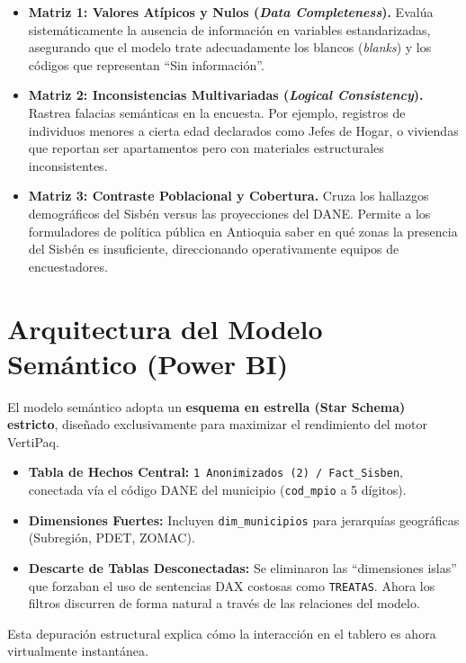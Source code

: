 \documentclass[12pt, a4paper]{article}
\begin{document}
\begin{itemize}
    \item \textbf{Matriz 1: Valores Atípicos y Nulos (\textit{Data Completeness}).} Evalúa sistemáticamente la ausencia de información en variables estandarizadas, asegurando que el modelo trate adecuadamente los blancos (\textit{blanks}) y los códigos que representan ``Sin información''.
    \item \textbf{Matriz 2: Inconsistencias Multivariadas (\textit{Logical Consistency}).} Rastrea falacias semánticas en la encuesta. Por ejemplo, registros de individuos menores a cierta edad declarados como Jefes de Hogar, o viviendas que reportan ser apartamentos pero con materiales estructurales inconsistentes.
    \item \textbf{Matriz 3: Contraste Poblacional y Cobertura.} Cruza los hallazgos demográficos del Sisbén versus las proyecciones del DANE. Permite a los formuladores de política pública en Antioquia saber en qué zonas la presencia del Sisbén es insuficiente, direccionando operativamente equipos de encuestadores.
\end{itemize}

\section{Arquitectura del Modelo Semántico (Power BI)}

El modelo semántico adopta un \textbf{esquema en estrella (Star Schema) estricto}, diseñado exclusivamente para maximizar el rendimiento del motor VertiPaq.

\begin{itemize}
    \item \textbf{Tabla de Hechos Central:} \texttt{1 Anonimizados (2) / Fact\_Sisben}, conectada vía el código DANE del municipio (\texttt{cod\_mpio} a 5 dígitos).
    \item \textbf{Dimensiones Fuertes:} Incluyen \texttt{dim\_municipios} para jerarquías geográficas (Subregión, PDET, ZOMAC).
    \item \textbf{Descarte de Tablas Desconectadas:} Se eliminaron las ``dimensiones islas'' que forzaban el uso de sentencias DAX costosas como \texttt{TREATAS}. Ahora los filtros discurren de forma natural a través de las relaciones del modelo.
\end{itemize}

Esta depuración estructural explica cómo la interacción en el tablero es ahora virtualmente instantánea.
\end{document}
